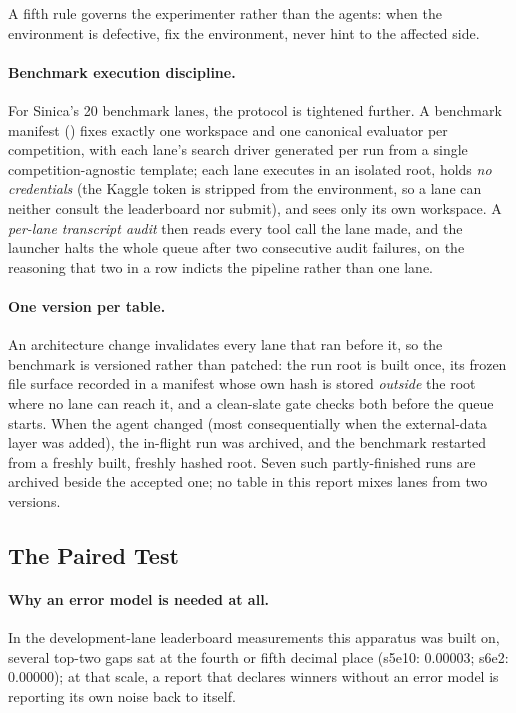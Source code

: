 \documentclass[11pt,a4paper]{article}
\begin{document}
A fifth rule governs the experimenter rather than the agents: when the environment is
defective, fix the environment, never hint to the affected side.

\paragraph{Benchmark execution discipline.} For Sinica's 20 benchmark lanes, the protocol is
tightened further. A benchmark manifest () fixes exactly one
workspace and one canonical evaluator per competition, with each lane's search driver generated
per run from a single competition-agnostic template; each lane executes in
an isolated root, holds \emph{no credentials} (the Kaggle token is stripped from the
environment, so a lane can neither consult the leaderboard nor submit), and sees only its own
workspace. A \emph{per-lane transcript audit} then reads every tool call the lane made, and the
launcher halts the whole queue after two consecutive audit failures, on the reasoning that two
in a row indicts the pipeline rather than one lane.

\paragraph{One version per table.} An architecture change invalidates every lane that ran before
it, so the benchmark is versioned rather than patched: the run root is built once, its frozen
file surface recorded in a manifest whose own hash is stored \emph{outside} the root where no
lane can reach it, and a clean-slate gate checks both before the queue starts. When the agent
changed (most consequentially when the external-data layer was added), the in-flight run
was archived, and the benchmark restarted from a freshly built, freshly hashed root. Seven such
partly-finished runs are archived beside the accepted one; no table in this report mixes lanes
from two versions.

\subsection{The Paired Test}
\label{sec:exp2}

\paragraph{Why an error model is needed at all.} In the development-lane leaderboard
measurements this apparatus was built on, several top-two gaps sat at the fourth or fifth
decimal place (s5e10: $0.00003$; s6e2: $0.00000$); at that scale, a report that declares winners
without an error model is reporting its own noise back to itself.
\end{document}
